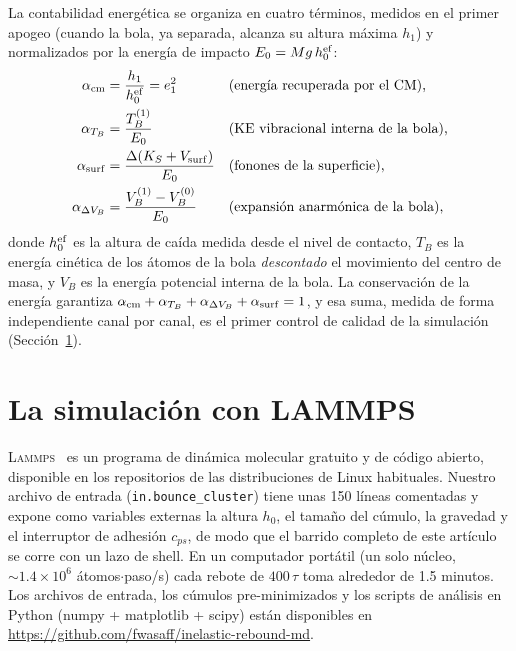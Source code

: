 \documentclass[10pt,a4paper,twocolumn]{article}
\newcommand{\lammps}{\textsc{Lammps}}
\begin{document}
La contabilidad energética se organiza en cuatro términos, medidos en el
primer apogeo (cuando la bola, ya separada, alcanza su altura máxima
$h_1$) y normalizados por la energía de impacto $E_0=Mg\,h_0^{\rm ef}$:
\begin{align}
    \alpha_{\rm cm}     &= \frac{h_1}{h_0^{\rm ef}} = e_1^2
        &&\text{(energía recuperada por el CM),} \label{eq:acm}\\
    \alpha_{T_B}        &= \frac{T_B^{(1)}}{E_0}
        &&\text{(KE vibracional interna de la bola),} \label{eq:atb}\\
    \alpha_{\rm surf}   &= \frac{\Delta(K_S + V_{\rm surf})}{E_0}
        &&\text{(fonones de la superficie),} \label{eq:asurf}\\
    \alpha_{\Delta V_B} &= \frac{V_B^{(1)}-V_B^{(0)}}{E_0}
        &&\text{(expansión anarmónica de la bola),} \label{eq:avb}
\end{align}
donde $h_0^{\rm ef}$ es la altura de caída medida desde el nivel de
contacto, $T_B$ es la energía cinética de los átomos de la bola
\emph{descontado} el movimiento del centro de masa, y $V_B$ es la energía
potencial interna de la bola. La conservación de la energía garantiza
$\alpha_{\rm cm}+\alpha_{T_B}+\alpha_{\Delta V_B}+\alpha_{\rm surf}=1$, y
esa suma, medida de forma independiente canal por canal, es el primer
control de calidad de la simulación (Sección~\ref{sec:metodos}).

\section{La simulación con LAMMPS}
\label{sec:metodos}

\lammps{}~\cite{Thompson2022} es un programa de dinámica molecular
gratuito y de código abierto, disponible en los repositorios de las
distribuciones de Linux habituales. Nuestro archivo de entrada
(\texttt{in.bounce\_cluster}) tiene unas 150 líneas comentadas y expone
como variables externas la altura $h_0$, el tamaño del cúmulo, la gravedad
y el interruptor de adhesión $c_{ps}$, de modo que el barrido completo de
este artículo se corre con un lazo de shell. En un computador portátil
(un solo núcleo, $\sim1.4\times10^6$ átomos$\cdot$paso/s) cada rebote de
$400\,\tau$ toma alrededor de 1.5 minutos. Los archivos de entrada, los
cúmulos pre-minimizados y los scripts de análisis en Python (numpy +
matplotlib + scipy) están disponibles en
\url{https://github.com/fwasaff/inelastic-rebound-md}.
\end{document}
